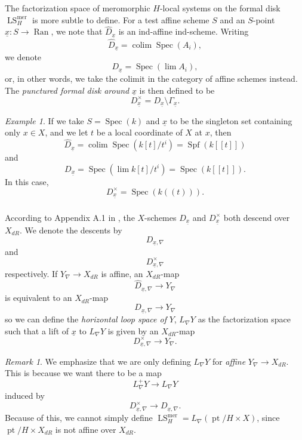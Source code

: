\documentclass[10pt]{amsart}
\theoremstyle{remark}
\newtheorem{rem}[subsubsection]{Remark}
\newtheorem{example}[subsubsection]{Example}
\newcommand{\on}[1]{\operatorname{#1}}
\newcommand{\Ran}{\on{Ran}}
\newcommand{\sssec}[1]{\subsubsection{}}
\begin{document}
\sssec{}
The factorization space of meromorphic $H$-local systems on the formal disk $\on{LS}_{H}^{\on{mer}}$ is more subtle to define. For a test affine scheme $S$ and an $S$-point $\underline{x} : S \to \Ran$, we note that $\hat{D}_{\underline{x}}$ is an ind-affine ind-scheme. Writing
$$
\hat{D}_{\underline{x}} = \on{colim} \on{Spec}(A_i),
$$
we denote
$$
D_{\underline{x}} = \on{Spec}(\on{lim} A_i),
$$
or, in other words, we take the colimit in the category of affine schemes instead. The \emph{punctured formal disk around} $\underline{x}$ is then defined to be
$$
D_{\underline{x}}^{\times} = D_{\underline{x}} \setminus \Gamma_{\underline{x}}.
$$

\begin{example}
    If we take $S = \on{Spec} (k)$ and $\underline{x}$ to be the singleton set containing only $x \in X$, and we let $t$ be a local coordinate of $X$ at $x$, then
    $$
    \hat{D}_{\underline{x}} = \on{colim} \on{Spec}(k[t]/t^i) = \on{Spf} (k[[t]])
    $$
    and
    $$
    D_{\underline{x}} = \on{Spec}(\on{lim} k[t]/t^i) = \on{Spec} (k[[t]]).
    $$
    In this case,
    $$
    D_{\underline{x}}^{\times} = \on{Spec} (k((t))).
    $$
\end{example}

\sssec{}
    According to Appendix A.1 in \cite{Katia}, the $X$-schemes $D_{\underline{x}}$ and $D_{\underline{x}}^{\times}$ both descend over $X_{dR}$. We denote the descents by
    $$
    D_{\underline{x}, \nabla}
    $$
    and
    $$
    D_{\underline{x}, \nabla}^{\times}
    $$
    respectively. If $Y_{\nabla} \to X_{dR}$ is affine, an $X_{dR}$-map
    $$
    \hat{D}_{\underline{x}, \nabla} \to Y_{\nabla}
    $$
    is equivalent to an $X_{dR}$-map
    $$
    D_{\underline{x}, \nabla} \to Y_{\nabla}
    $$
    so we can define the \emph{horizontal loop space of} $Y$, $L_{\nabla}Y$ as the factorization space such that a lift of $\underline{x}$ to $L_{\nabla}Y$ is given by an $X_{dR}$-map
    $$
    D_{\underline{x}, \nabla}^{\times} \to Y_{\nabla}.
    $$

\begin{rem}
We emphasize that we are only defining $L_{\nabla}Y$ for \emph{affine} $Y_{\nabla} \to X_{dR}$. This is because we want there to be a map
$$
L_{\nabla}^+Y \to L_{\nabla}Y
$$
induced by
$$
D_{\underline{x}, \nabla}^{\times} \to D_{\underline{x}, \nabla}.
$$
Because of this, we cannot simply define $\on{LS}_{H}^{\on{mer}} = L_{\nabla}(\on{pt}/H \times X)$, since $\on{pt}/H \times X_{dR}$ is not affine over $X_{dR}$.
\end{rem}
\end{document}
